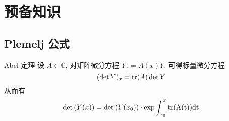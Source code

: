 \chapter{预备知识}
\section{Plemelj 公式}
\begin{theorem}{Abel 定理}
  设 $ A \in \mathbb{C} $, 对矩阵微分方程 $ Y_{x} = A(x)Y $, 可得标量微分方程
  \begin{equation}
    (\det Y)_{x} = \operatorname*{tr}(A) \det Y
  \end{equation}
  从而有 
  \begin{equation}
    \det \left(Y(x)\right) = \det \left(Y(x_{0})\right) \cdot \exp{\int_{x_{0}}^{x} \rm{tr}(A(t)) \mathrm{d}t} 
  \end{equation}
\end{theorem}

